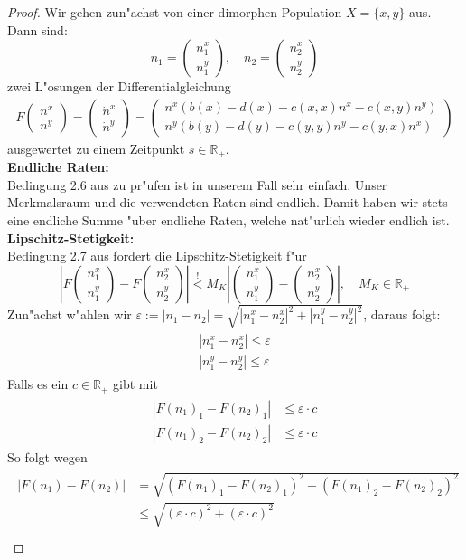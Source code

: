 \documentclass[11pt, a4paper, german]{article}
\theoremstyle{plain}
\newcommand{\eps}{\ensuremath{\varepsilon}}
\newcommand{\tvec}[2]{\begin{pmatrix}#1\\#2\end{pmatrix}}
\begin{document}
	\begin{proof}
		Wir gehen zun"achst von einer dimorphen Population $ X = \{x,y\} $ aus. Dann sind:\\ 
			\[ n_1 = \tvec{n_1^x}{n_1^y}, \quad n_2 = \tvec{n_2^x}{n_2^y} \]
			zwei L"osungen der Differentialgleichung
			\begin{align}
				F\tvec{n^x}{n^y} = \tvec{\dot{n}^x}{\dot{n}^y} =  \tvec{n^x(b(x)-d(x)-c(x,x)n^x-c(x,y)n^y)}{n^y(b(y)-d(y)-c(y,y)n^y-c(y,x)n^x)}
				\label{nDGL}
			\end{align}
			ausgewertet zu einem Zeitpunkt $ s \in \mathbb{R}_{+} $.\\
			\textbf{Endliche Raten:}\\
			Bedingung 2.6 aus \cite[\textbf{Thm 2.1}]{ethier2009markov} zu pr"ufen ist in unserem Fall sehr einfach. Unser Merkmalsraum und die verwendeten Raten sind endlich. Damit haben wir stets eine endliche Summe "uber endliche Raten, welche nat"urlich wieder endlich ist.\\
			\textbf{Lipschitz-Stetigkeit:}\\
			Bedingung 2.7 aus \cite[\textbf{Thm 2.1}]{ethier2009markov} fordert die Lipschitz-Stetigkeit f"ur 
			\[ \left| F\tvec{n_1^x}{n_1^y} - F\tvec{n_2^x}{n_2^y} \right| \overset{!}{<} M_K \left| \tvec{n_1^x}{n_1^y} - \tvec{n_2^x}{n_2^y} \right|, \quad M_K \in \mathbb{R}_{+} \]
			Zun"achst w"ahlen wir $ \eps := |n_1 - n_2| = \sqrt{|n_1^x - n_2^x|^2 + |n_1^y - n_2^y|^2} $, daraus folgt:
			\begin{align}
			\begin{split}
				|n_1^x - n_2^x| \le \eps\\
				|n_1^y - n_2^y| \le \eps \label{epsAbsch}
			\end{split}
			\end{align}
			Falls es ein $ c \in \mathbb{R}_{+} $ gibt mit
			\begin{align}
			\begin{split}
				|F(n_1)_1 - F(n_2)_1| &\le \eps \cdot c\\
				|F(n_1)_2 - F(n_2)_2| &\le \eps \cdot c \label{BeweisLipschitz}
			\end{split}
			\end{align}
			So folgt wegen 
			\begin{align}
			\begin{split}
				|F(n_1) - F(n_2)| &= \sqrt{(F(n_1)_1 - F(n_2)_1)^2 + (F(n_1)_2 - F(n_2)_2)^2}\\
				&\le \sqrt{(\eps \cdot c)^2 + (\eps \cdot c)^2}\\

\end{split}
\end{align}
\end{proof}
\end{document}
